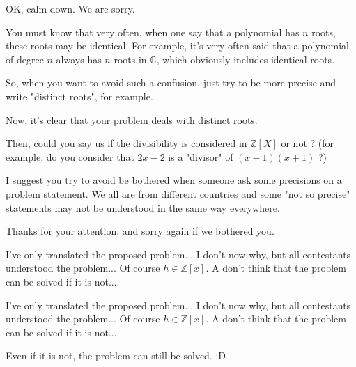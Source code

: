 \begin{solution}
	OK, calm down. We are sorry.

You must know that very often, when one say that a polynomial has $ n$ roots, these roots may be identical. For example, it's very often said that a polynomial of degree $ n$ always has $ n$ roots in $ \mathbb C$, which obviously includes identical roots.

So, when you want to avoid such a confusion, just try to be more precise and write "distinct roots", for example.

Now, it's clear that your problem deals with distinct roots.

Then, could you say us if the divisibility is considered in $ \mathbb Z[X]$ or not ? (for example, do you consider that $ 2x - 2$ is a "divisor" of $ (x - 1)(x + 1)$ ?)

I suggest you try to avoid be bothered when someone ask some precisions on a problem statement. We all are from different countries and some "not so precise" statements may not be understood in the same way everywhere.

Thanks for your attention, and sorry again if we bothered you.
\end{solution}



\begin{solution}
	I've only translated the proposed problem... I don't now why, but all contestants understood the problem... 
Of course $ h \in \mathbb{Z}[x]$. A don't think that the problem can be solved if it is not....
\end{solution}



\begin{solution}
	\begin{tcolorbox}I've only translated the proposed problem... I don't now why, but all contestants understood the problem... 
Of course $ h \in \mathbb{Z}[x]$. A don't think that the problem can be solved if it is not....\end{tcolorbox}

Even if it is not, the problem can still be solved.  :D
\end{solution}



